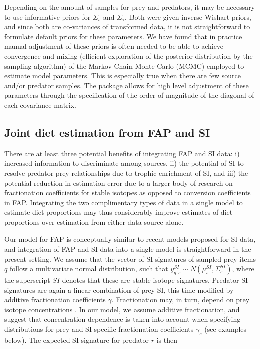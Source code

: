 \documentclass[fleqn,10pt]{wlpeerj}
\begin{document}
Depending on the amount of samples for prey and predators, it
may be necessary to use informative priors for $\Sigma_{s}$ and
$\Sigma_{\tau}$. Both were given inverse-Wishart priors, and since both are co-variances of transformed data, it is
not straightforward to formulate default priors for these parameters. We have found that in practice manual adjustment of these priors
is often needed to be able to achieve convergence and mixing
(efficient exploration of the posterior distribution by the sampling
algorithm) of the Markov Chain Monte Carlo (MCMC) employed to estimate
model parameters. This is especially true when there are few source and/or predator samples. The
package allows for high level adjustment of these parameters through
the specification of the order of magnitude of the diagonal of each
covariance matrix. 

\subsection*{Joint diet estimation from FAP and SI}
There are at least three potential benefits of integrating FAP and SI
data: i) increased information to discriminate among sources, ii) the
potential of SI to resolve predator prey relationships due to trophic
enrichment of SI, and iii) the potential reduction in estimation error
due to a larger body of research on fractionation coefficients for stable
isotopes as opposed to conversion coefficients in FAP. Integrating the two complimentary types of data
in a single model to estimate diet proportions may thus considerably
improve estimates of diet proportions over estimation from either
data-source alone.

Our model for FAP is conceptually similar to recent models proposed for SI data, and
integration of FAP and SI data into a single model is straightforward
in the present setting. We assume that the vector of SI signatures of
sampled prey
items $q$ follow a multivariate normal distribution, such that
$y_{q,s}^{SI} \sim N(\mu_s^{SI},\Sigma_s^{SI})$, where the superscript
$SI$ denotes that these are stable isotope signatures. Predator SI
signatures are again a linear combination of prey SI, this time
modified by additive fractionation coefficients
$\gamma$. Fractionation may, in turn, depend on prey isotope concentrations
\citep{hussey_rescaling_2014,caut_variation_2009}. In our model, we
assume additive fractionation, and suggest that concentration
dependence is taken into account when specifying distributions for
prey and SI specific fractionation coefficients $\gamma_s$ (see
examples below). The expected SI signature for predator $r$ is then
\end{document}
